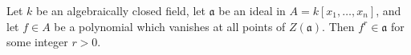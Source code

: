 Let $k$ be an algebraically closed field, let $\mathfrak{a}$ be an ideal in $A = k[x_1, \ldots, x_n]$, and let $f \in A$ be a polynomial which vanishes at all points of $Z(\mathfrak{a})$. Then $f^r \in \mathfrak{a}$ for some integer $r > 0$.
